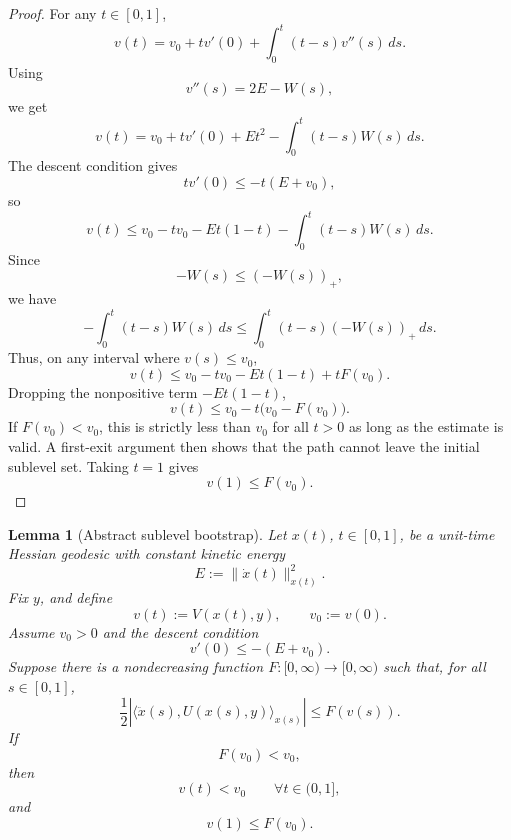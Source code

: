\documentclass[11pt]{article}
\newtheorem{lemma}{Lemma}
\begin{document}
\begin{proof}
For any \(t\in[0,1]\),
\[
    v(t)
    =
    v_0+t v'(0)+\int_0^t(t-s)v''(s)\,ds.
\]
Using
\[
    v''(s)=2E-W(s),
\]
we get
\[
    v(t)
    =
    v_0+t v'(0)+Et^2-\int_0^t(t-s)W(s)\,ds.
\]
The descent condition gives
\[
    t v'(0)\le -t(E+v_0),
\]
so
\[
    v(t)
    \le
    v_0-tv_0-Et(1-t)
    -
    \int_0^t(t-s)W(s)\,ds.
\]
Since
\[
    -W(s)\le (-W(s))_+,
\]
we have
\[
    -\int_0^t(t-s)W(s)\,ds
    \le
    \int_0^t(t-s)(-W(s))_+\,ds.
\]
Thus, on any interval where \(v(s)\le v_0\),
\[
    v(t)
    \le
    v_0-tv_0-Et(1-t)+tF(v_0).
\]
Dropping the nonpositive term \(-Et(1-t)\),
\[
    v(t)
    \le
    v_0-t\bigl(v_0-F(v_0)\bigr).
\]
If \(F(v_0)<v_0\), this is strictly less than \(v_0\) for all \(t>0\)
as long as the estimate is valid. A first-exit argument then shows that
the path cannot leave the initial sublevel set. Taking \(t=1\) gives
\[
    v(1)\le F(v_0).
\]
\end{proof}



\begin{lemma}[Abstract sublevel bootstrap]\label{lem:bootstrap}
Let \(x(t)\), \(t\in[0,1]\), be a unit-time Hessian geodesic with constant
kinetic energy
\[
    E:=\|\dot x(t)\|_{x(t)}^2.
\]
Fix \(y\), and define
\[
    v(t):=V(x(t),y),
    \qquad
    v_0:=v(0).
\]
Assume \(v_0>0\) and the descent condition
\[
    v'(0)\le -(E+v_0).
\]
Suppose there is a nondecreasing function \(F:[0,\infty)\to[0,\infty)\)
such that, for all \(s\in[0,1]\),
\[
    \frac12
    \left|
    \langle \ddot x(s),U(x(s),y)\rangle_{x(s)}
    \right|
    \le
    F(v(s)).
\]
If
\[
    F(v_0)<v_0,
\]
then
\[
    v(t)<v_0
    \qquad
    \forall t\in(0,1],
\]
and
\[
    v(1)\le F(v_0).
\]
\end{lemma}
\end{document}

